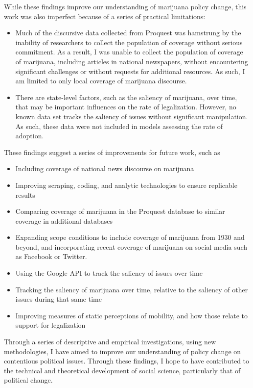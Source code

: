  While these findings improve our understanding of marijuana policy change, this work was also imperfect because of a series of practical limitations:
 
  \begin{itemize}
 \item Much of the discursive data collected from Proquest was hamstrung by the inability of researchers to collect the population of coverage without serious commitment. As a result, I was unable to collect the population of coverage of marijuana, including articles in national newspapers, without encountering significant challenges or without requests for additional resources. As such, I am limited to only local coverage of marijuana discourse.
 \item There are state-level factors, such as the saliency of marijuana, over time, that may be important influences on the rate of legalization. However, no known data set tracks the saliency of issues without significant manipulation. As such, these data were not included in models assessing the rate of adoption.
 \end{itemize}
 
 These findings suggest a series of improvements for future work, such as
 
 \begin{itemize}
 \item Including coverage of national news discourse on marijuana
 \item Improving scraping, coding, and analytic technologies to ensure replicable results
 \item Comparing coverage of marijuana in the Proquest database to similar coverage in additional databases
 \item Expanding scope conditions to include coverage of marijuana from 1930 and beyond, and incorporating recent coverage of marijuana on social media such as Facebook or Twitter.
 \item Using the Google API to track the saliency of issues over time
 \item Tracking the saliency of marijuana over time, relative to the saliency of other issues during that same time
 \item Improving measures of static perceptions of mobility, and how those relate to support for legalization
 \end{itemize}
 
 
 Through a series of descriptive and empirical investigations, using new methodologies, I have aimed to improve our understanding of policy change on contentious political issues. Through these findings, I hope to have contributed to the technical and theoretical development of social science, particularly that of political change. 
 
 
